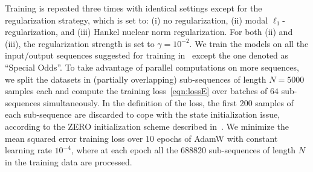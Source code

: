 \documentclass{article} %
\begin{document}
Training is repeated three times with identical settings except for the regularization strategy, which is set to: (i) no regularization, (ii) modal $\ell_1$-regularization, and (iii) Hankel nuclear norm regularization. For both (ii) and (iii), the regularization strength  is set to $\gamma=10^{-2}$. 
We train the models on all the input/output sequences suggested for training in~\cite{noel2017f} except the one denoted as ``Special Odds''. To take advantage of parallel computations on more sequences, we split the datasets in (partially overlapping) sub-sequences of length $N=5000$ samples each and compute the training loss~\eqref{eqn:lossE} over batches of $64$ sub-sequences simultaneously. In the definition of the loss, the first 200 samples of each sub-sequence are discarded to cope with the state initialization issue, according to the ZERO initialization scheme described in~\cite{forgione2022learning}. We minimize the mean squared error training loss over $10$ epochs of AdamW with constant learning rate $10^{-4}$, where at each epoch all the 688820 sub-sequences of length $N$ in the training data are processed. 
\end{document}
